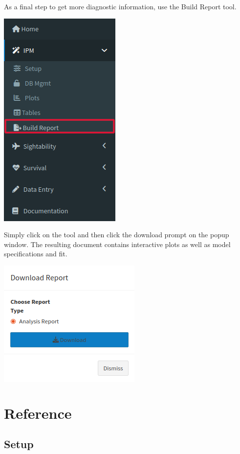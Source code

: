 \documentclass[
]{book}
\begin{document}
As a final step to get more diagnostic information, use the Build Report tool.

\includegraphics{./www/ipm_walk10.png}

Simply click on the tool and then click the download prompt on the popup window. The resulting document contains interactive plots as well as model specifications and fit.

\includegraphics{./www/ipm_walk9.png}

\hypertarget{ipm-ref}{%
\section{Reference}\label{ipm-ref}}

\hypertarget{ipm-setup}{%
\subsection{Setup}\label{ipm-setup}}
\end{document}
